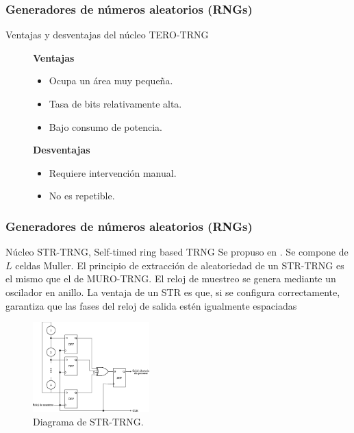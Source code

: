 \documentclass[10pt]{beamer}
\begin{document}
\begin{frame}
    \frametitle{Generadores de números aleatorios (RNGs)}
    \begin{block}{Ventajas y desventajas del núcleo TERO-TRNG}
        \justifying
          \begin{figure}[!h]
				\begin{minipage}[t]{0.48\textwidth}
					\textbf{Ventajas}
					\begin{itemize}
						\justifying
						\item Ocupa un área muy pequeña.
						\item Tasa de bits relativamente alta.
						\item Bajo consumo de potencia.
					\end{itemize}
				\end{minipage} \hfill \begin{minipage}[t]{0.48\textwidth}
					\textbf{Desventajas}
					\begin{itemize}
						\justifying
						\item Requiere intervención manual.
						\item No es repetible.
					\end{itemize}
				\end{minipage}
			\end{figure}		
	\end{block}
\end{frame}

\begin{frame}
    \frametitle{Generadores de números aleatorios (RNGs)}
    \begin{block}{Núcleo STR-TRNG, Self-timed ring based TRNG}
        \justifying
         Se propuso en \cite{Cherkaoui2013}. Se compone de $L$ celdas Muller. El principio de extracción de aleatoriedad de un STR-TRNG es el mismo que el de MURO-TRNG. El reloj de muestreo se genera mediante un oscilador en anillo. La ventaja de un STR es que, si se configura correctamente, garantiza que las fases del reloj de salida estén igualmente espaciadas
	\end{block}
	\begin{figure}[hbtp]
	    \centering
	    \includegraphics[width=0.4\textwidth]{A5_STR_TRNG}
	    \caption{Diagrama de STR-TRNG.}
        \label{fig:A5_STR_TRNG}
    \end{figure}
\end{frame}
\end{document}
